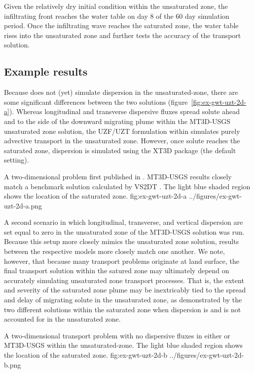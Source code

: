 

Given the relatively dry initial condition within the unsaturated zone, the infiltrating front reaches the water table on day 8 of the 60 day simulation period. Once the infiltrating wave reaches the saturated zone, the water table rises into the unsaturated zone and further tests the accuracy of the transport solution.

\subsection{Example results}

Because \mf does not (yet) simulate dispersion in the unsaturated-zone, there are some significant differences between the two solutions (figure~\ref{fig:ex-gwt-uzt-2d-a}).  Whereas longitudinal and transverse dispersive fluxes spread solute ahead and to the side of the downward migrating plume within the MT3D-USGS unsaturated zone solution, the UZF/UZT formulation within \mf simulates purely advective transport in the unsaturated zone.  However, once solute reaches the saturated zone, dispersion is simulated using the XT3D package (the default setting).  

\begin{StandardFigure}
	{A two-dimensional problem first published in \cite{morway2013}.  MT3D-USGS results closely match a benchmark solution calculated by VS2DT \citep{lappalaetal1987VS2D}.  The light blue shaded region shows the location of the saturated zone.}
	{fig:ex-gwt-uzt-2d-a}
	{../figures/ex-gwt-uzt-2d-a.png}
\end{StandardFigure}

A second scenario in which longitudinal, transverse, and vertical dispersion are set equal to zero in the unsaturated zone of the MT3D-USGS solution was run.  Because this setup more closely mimics the \mf unsaturated zone solution, results between the respective models more closely match one another.  We note, however, that because many transport problems originate at land surface, the final transport solution within the satured zone may ultimately depend on accurately simulating unsaturated zone transport processes.  That is, the extent and severity of the saturated zone plume may be inextricably tied to the spread and delay of migrating solute in the unsaturated zone, as demonstrated by the two different solutions within the saturated zone when dispersion is and is not accounted for in the unsaturated zone.

\begin{StandardFigure}
	{A two-dimensional transport problem with no dispersive fluxes in either \mf or MT3D-USGS within the unsaturated-zone.  The light blue shaded region shows the location of the saturated zone.}
	{fig:ex-gwt-uzt-2d-b}
	{../figures/ex-gwt-uzt-2d-b.png}
\end{StandardFigure}
